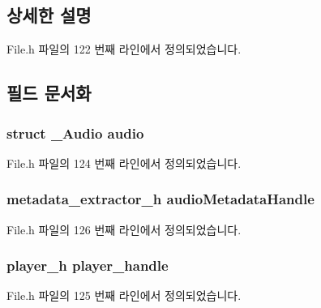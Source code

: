 \subsection{상세한 설명}


File.\-h 파일의 122 번째 라인에서 정의되었습니다.



\subsection{필드 문서화}
\hypertarget{struct__AudioExtends_a5fd9dfc5896f2475249e5814bc957cd3}{
\subsubsection[{audio}]{\setlength{\rightskip}{0pt plus 5cm}struct {\bf \-\_\-\-Audio} audio}}\label{struct__AudioExtends_a5fd9dfc5896f2475249e5814bc957cd3}


File.\-h 파일의 124 번째 라인에서 정의되었습니다.

\hypertarget{struct__AudioExtends_afb8274c680a31f19a7967b768e11ba52}{
\subsubsection[{audio\-Metadata\-Handle}]{\setlength{\rightskip}{0pt plus 5cm}metadata\-\_\-extractor\-\_\-h audio\-Metadata\-Handle}}\label{struct__AudioExtends_afb8274c680a31f19a7967b768e11ba52}


File.\-h 파일의 126 번째 라인에서 정의되었습니다.

\hypertarget{struct__AudioExtends_acdbf0738be9fa70a60412d48cad881ee}{
\subsubsection[{player\-\_\-handle}]{\setlength{\rightskip}{0pt plus 5cm}player\-\_\-h player\-\_\-handle}}\label{struct__AudioExtends_acdbf0738be9fa70a60412d48cad881ee}


File.\-h 파일의 125 번째 라인에서 정의되었습니다.

